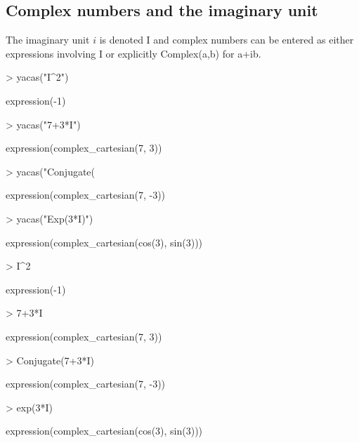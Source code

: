 \documentclass[]{article}
\begin{document}
\subsection{Complex numbers and the imaginary unit} 

The imaginary unit $i$ is denoted I and complex numbers can be entered
as either expressions involving I or explicitly Complex(a,b) for a+ib.
\begin{Schunk}
\begin{Sinput}
> yacas("I^2")
\end{Sinput}
\begin{Soutput}
expression(-1)
\end{Soutput}
\begin{Sinput}
> yacas("7+3*I")
\end{Sinput}
\begin{Soutput}
expression(complex_cartesian(7, 3))
\end{Soutput}
\begin{Sinput}
> yacas("Conjugate(%)")
\end{Sinput}
\begin{Soutput}
expression(complex_cartesian(7, -3))
\end{Soutput}
\begin{Sinput}
> yacas("Exp(3*I)")
\end{Sinput}
\begin{Soutput}
expression(complex_cartesian(cos(3), sin(3)))
\end{Soutput}
\end{Schunk}

\begin{Schunk}
\begin{Sinput}
> I^2
\end{Sinput}
\begin{Soutput}
expression(-1)
\end{Soutput}
\begin{Sinput}
> 7+3*I
\end{Sinput}
\begin{Soutput}
expression(complex_cartesian(7, 3))
\end{Soutput}
\begin{Sinput}
> Conjugate(7+3*I)
\end{Sinput}
\begin{Soutput}
expression(complex_cartesian(7, -3))
\end{Soutput}
\begin{Sinput}
> exp(3*I)
\end{Sinput}
\begin{Soutput}
expression(complex_cartesian(cos(3), sin(3)))
\end{Soutput}
\end{Schunk}
\end{document}
